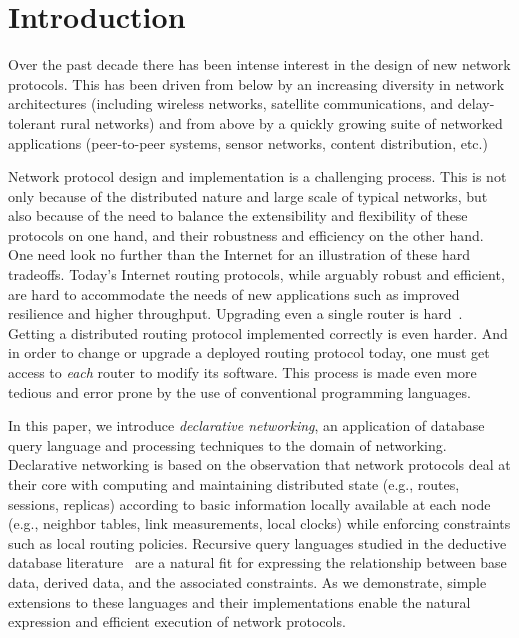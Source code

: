 \section{Introduction}

Over the past decade there has been intense interest in the design of
new network protocols.  This has been driven from below by an
increasing diversity in network architectures (including wireless
networks, satellite communications, and delay-tolerant rural networks)
and from above by a quickly growing suite of networked applications
(peer-to-peer systems, sensor networks, content distribution, etc.)

Network protocol design and implementation is a challenging process.
This is not only because of the distributed nature and large scale of
typical networks, but also because of the need to balance the
extensibility and flexibility of these protocols on one hand, and
their robustness and efficiency on the other hand. One need look no
further than the Internet for an illustration of these hard
tradeoffs. Today's Internet routing protocols, while arguably robust
and efficient, are hard to accommodate the needs of new applications
such as improved resilience and higher throughput.  Upgrading even a
single router is hard~\cite{xorp}.  Getting a distributed routing
protocol implemented correctly is even harder. And in order to change
or upgrade a deployed routing protocol today, one must get access to
{\em each} router to modify its software.  This process is made even
more tedious and error prone by the use of conventional programming
languages.

In this paper, we introduce {\em declarative networking}, an
application of database query language and processing techniques to
the domain of networking.  Declarative networking is based on the
observation that network protocols deal at their core with computing
and maintaining distributed state (e.g., routes, sessions, replicas)
according to basic information locally available at each node (e.g.,
neighbor tables, link measurements, local clocks) while enforcing
constraints such as local routing policies.  Recursive query languages
studied in the deductive database literature~\cite{alicebook,
  ramakrishnan93survey} are a natural fit for expressing the
relationship between base data, derived data, and the associated
constraints.  As we demonstrate, simple extensions to these languages
and their implementations enable the natural expression and efficient
execution of network protocols.

